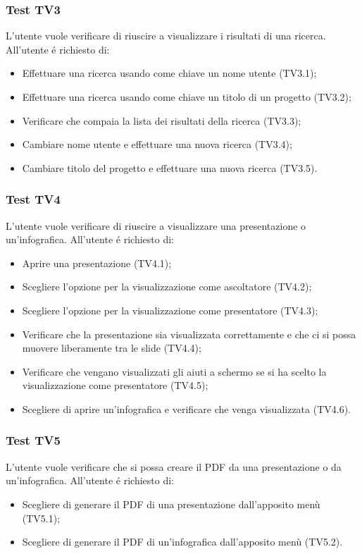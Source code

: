 \subsubsection{Test TV3}
L'utente vuole verificare di riuscire a visualizzare i risultati di una ricerca. \newline
All'utente é richiesto di:
\begin{itemize}
	\item Effettuare una ricerca usando come chiave un nome utente (TV3.1);
	\item Effettuare una ricerca usando come chiave un titolo di un progetto (TV3.2);
	\item Verificare che compaia la lista dei risultati della ricerca (TV3.3);
	\item Cambiare nome utente e effettuare una nuova ricerca (TV3.4);
	\item Cambiare titolo del progetto e effettuare una nuova ricerca (TV3.5).
\end{itemize}

\subsubsection{Test TV4}
L'utente vuole verificare di riuscire a visualizzare una presentazione o un'infografica. \newline
All'utente é richiesto di:
\begin{itemize}
	\item Aprire una presentazione (TV4.1);
	\item Scegliere l'opzione per la visualizzazione come ascoltatore (TV4.2);
	\item Scegliere l'opzione per la visualizzazione come presentatore (TV4.3);
	\item Verificare che la presentazione sia visualizzata correttamente e che ci si possa muovere liberamente tra le \gls{slide} (TV4.4);
	\item Verificare che vengano visualizzati gli aiuti a schermo se si ha scelto la visualizzazione come presentatore (TV4.5);
	\item Scegliere di aprire un'infografica e verificare che venga visualizzata (TV4.6).
\end{itemize}


\subsubsection{Test TV5}
L'utente vuole verificare che si possa creare il PDF da una presentazione o da un'infografica. \newline
All'utente é richiesto di:
\begin{itemize}
	\item Scegliere di generare il PDF di una presentazione dall'apposito menù (TV5.1);
	\item Scegliere di generare il PDF di un'infografica dall'apposito menù (TV5.2).
\end{itemize}

